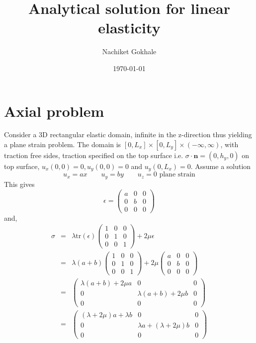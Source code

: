 \documentclass[12pt]{article}
\newcommand{\beq}{\begin{equation}}
\newcommand{\eeq}{\end{equation}}
\newcommand{\ber}{\begin{eqnarray}}
\newcommand{\eer}{\end{eqnarray}}
\begin{document}
\title{Analytical solution for linear elasticity}
\date{\today}
\author{Nachiket Gokhale}
\maketitle
\section{Axial problem}
Consider a 3D rectangular elastic domain, infinite in the z-direction thus yielding a plane strain problem. The domain is  $[0,L_x]\times[0,L_y]\times(-\infty,\infty)$, with traction free sides, traction specified on the top surface i.e. $\sigma\cdot{\mathbf{n}}=(0,h_y,0)$ on top surface, $u_x(0,0)=0,u_y(0,0)=0$ and $u_y(0,L_x)=0$. Assume a solution
\beq
u_x=ax \qquad u_y = by \qquad u_z = 0\,\, \text{plane strain}
\eeq
This gives
\beq
\epsilon = \begin{pmatrix}a & 0 & 0 \\ 0 & b & 0 \\ 0 & 0 & 0 \end{pmatrix}
\eeq
and,
\ber
\sigma &=& \lambda\text{tr}(\epsilon)\begin{pmatrix}1 & 0 & 0\\ 0 & 1 & 0\\0 & 0 & 1\end{pmatrix} + 2\mu\epsilon \\
  &=& \lambda(a+b)\begin{pmatrix}1 & 0 & 0\\ 0 & 1 & 0\\0 & 0 & 1\end{pmatrix} +  2\mu\begin{pmatrix}a & 0 & 0 \\ 0 & b & 0 \\ 0 & 0 & 0 \end{pmatrix} \\
  &=& \begin{pmatrix}\lambda(a+b)+2\mu{a} & 0 & 0 \\ 0 & \lambda(a+b)+2\mu{b} &0 \\ 0 & 0 & 0\end{pmatrix}  \\
  &=& \begin{pmatrix} (\lambda+2\mu)a + \lambda{b}& 0 & 0\\0 & \lambda{a} + (\lambda+2\mu)b &0 \\ 0 & 0 & 0 \end{pmatrix} 
      \eer
      
\end{document}
